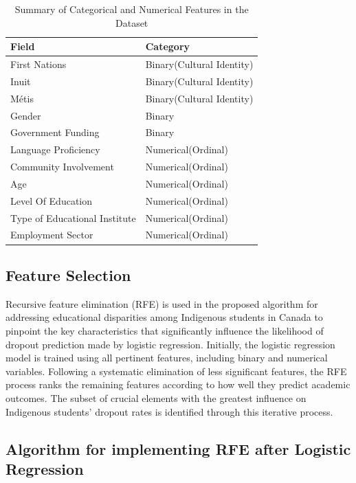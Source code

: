 \documentclass[final,12p,twocolumn]{article}
\begin{document}
\begin{table}[t]
  \centering
  \small
  \begin{tabularx}{\columnwidth}{|X|X|}
    \hline
    \textbf{Field} & \textbf{Category} \\
    \hline
    First Nations & Binary(Cultural Identity) \\
    \hline
    Inuit & Binary(Cultural Identity) \\
    \hline
    Métis & Binary(Cultural Identity) \\
    \hline
    Gender & Binary \\
    \hline
    Government Funding & Binary \\
    \hline
    Language Proficiency & Numerical(Ordinal) \\
    \hline
    Community Involvement & Numerical(Ordinal) \\
    \hline
    Age & Numerical(Ordinal) \\
    \hline
    Level Of Education & Numerical(Ordinal) \\
    \hline
    Type of Educational Institute & Numerical(Ordinal) \\
    \hline
    Employment Sector & Numerical(Ordinal) \\
    \hline
  \end{tabularx}
  \caption{Summary of Categorical and Numerical Features in the Dataset}
\end{table}

\subsection{Feature Selection}
Recursive feature elimination (RFE) \cite{r17} is used in the proposed algorithm
for addressing educational disparities among Indigenous students in Canada
to pinpoint the key characteristics that significantly influence the likelihood of dropout prediction made by logistic regression. Initially, the logistic regression model is trained using all pertinent features, including binary and numerical variables. Following a systematic elimination of less significant features, the RFE process ranks the remaining features according to how well they predict academic outcomes. The subset of crucial elements with the greatest influence on Indigenous students’ dropout rates is identified through this iterative process.

\subsection{Algorithm for implementing RFE after Logistic Regression}
\end{document}

